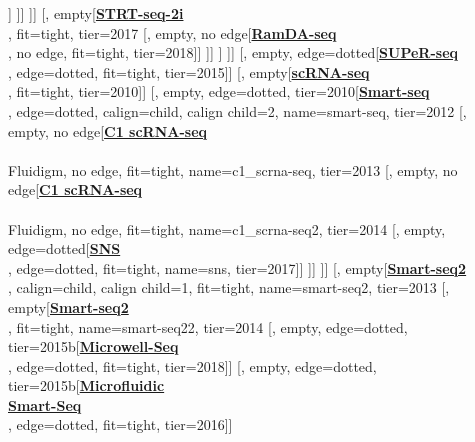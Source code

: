 \documentclass[12pt, a4]{article}
\begin{document}
\begin{center}
\begin{forest}
						[, empty[\href{https://www.nature.com/articles/s41467-018-05347-6}{\textbf{mcSCRB-seq}}\\\citealt{bagnoli2018}, fit=tight, tier=2018]]
					]]
				]]
				[, empty[\href{https://www.nature.com/articles/s41598-017-16546-4}{\textbf{STRT-seq-2i}}\\\citealt{hochgerner2017}, fit=tight, tier=2017
					[, empty, no edge[\href{https://www.nature.com/articles/s41598-017-16546-4}{\textbf{RamDA-seq}}\\\citealt{hayashi2018}, no edge, fit=tight, tier=2018]]
				]]
			]
		]]
		[, empty, edge=dotted[\href{https://genomebiology.biomedcentral.com/articles/10.1186/s13059-015-0706-1}{\textbf{SUPeR-seq}}\\\citealt{fan2015}, edge=dotted, fit=tight, tier=2015]]
		[, empty[\href{https://www.nature.com/articles/nprot.2009.236}{\textbf{scRNA-seq}}\\\citealt{tang2010}, fit=tight, tier=2010]]
		[, empty, edge=dotted, tier=2010[\href{https://www.nature.com/articles/nbt.2282}{\textbf{Smart-seq}}\\\citealt{ramskold2012}, edge=dotted, calign=child, calign child=2, name=smart-seq, tier=2012
			[, empty, no edge[\href{https://www.nature.com/articles/nmeth.2694}{\textbf{C1 scRNA-seq}}\\\citealt{wu2013}\\Fluidigm, no edge, fit=tight, name=c1_scrna-seq, tier=2013
				[, empty, no edge[\href{https://www.nature.com/articles/nbt.2967}{\textbf{C1 scRNA-seq}}\\\citealt{pollen2014}\\Fluidigm, no edge, fit=tight, name=c1_scrna-seq2, tier=2014
					[, empty, edge=dotted[\href{https://www.nature.com/articles/s41598-017-04426-w}{\textbf{SNS}}\\\citealt{lake2017b}, edge=dotted, fit=tight, name=sns, tier=2017]]
					]]
			]]
			[, empty[\href{https://www.nature.com/articles/nmeth.2639}{\textbf{Smart-seq2}}\\\citealt{picelli2013}, calign=child, calign child=1, fit=tight, name=smart-seq2, tier=2013
				[, empty[\href{https://www.nature.com/articles/nprot.2014.006}{\textbf{Smart-seq2}}\\\citealt{picelli2014}, fit=tight, name=smart-seq22, tier=2014
						[, empty, edge=dotted, tier=2015b[\href{https://www.cell.com/cell/fulltext/S0092-8674(18)30116-8}{\textbf{Microwell-Seq}}\\\citealt{han2018}, edge=dotted, fit=tight, tier=2018]]
						[, empty, edge=dotted, tier=2015b[\href{https://www.nature.com/articles/ncomms10220}{\textbf{Microfluidic}}\\\href{https://www.nature.com/articles/ncomms10220}{\textbf{Smart-Seq}}\\\citealt{kimmerling2016}, edge=dotted, fit=tight, tier=2016]]

\end{forest}
\end{center}
\end{document}
